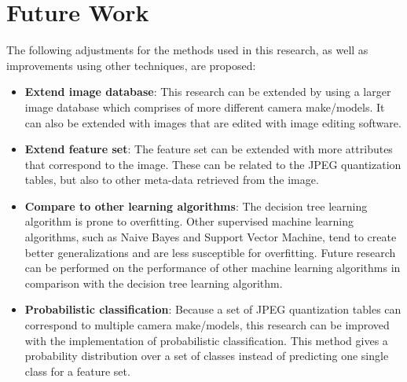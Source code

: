 \section{Future Work}\label{sec:fut}
The following adjustments for the methods used in this research, as well as improvements using other techniques, are proposed:
\begin{itemize}
\item \textbf{Extend image database}: This research can be extended by using a larger image database which comprises of more different camera make/models. It can also be extended with images that are edited with image editing software.
\item \textbf{Extend feature set}: The feature set can be extended with more attributes that correspond to the image. These can be related to the JPEG quantization tables, but also to other meta-data retrieved from the image.
\item \textbf{Compare to other learning algorithms}: The decision tree learning algorithm is prone to overfitting. Other supervised machine learning algorithms, such as Naive Bayes and Support Vector Machine, tend to create better generalizations and are less susceptible for overfitting. Future research can be performed on the performance of other machine learning algorithms in comparison with the decision tree learning algorithm.
\item \textbf{Probabilistic classification}: Because a set of JPEG quantization tables can correspond to multiple camera make/models, this research can be improved with the implementation of probabilistic classification. This method gives a probability distribution over a set of classes instead of predicting one single class for a feature set.

\end{itemize}
